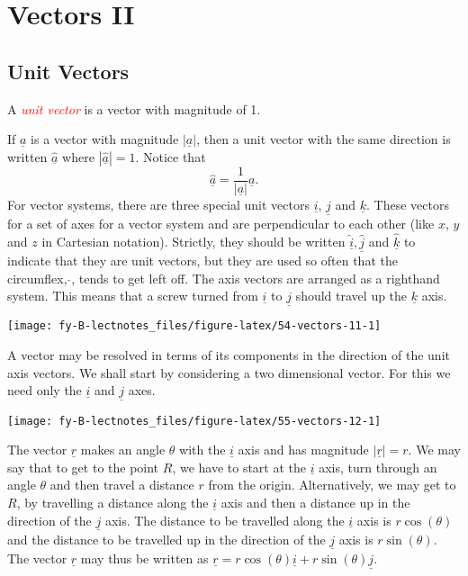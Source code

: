 \documentclass[
  11pt,
  oneside]{book}
\newcommand{\slide}{}
\theoremstyle{definition}
\theoremstyle{definition}
\theoremstyle{definition}
\theoremstyle{definition}
\theoremstyle{remark}
\begin{document}
\slide

\section{Vectors II}\label{vectors-ii}

\subsection{Unit Vectors}\label{unit-vectors}

A \textcolor{red}{\em unit vector} is a vector with magnitude of 1.

If \(\underline a\) is a vector with magnitude \(|\underline a|\), then a unit vector with the same direction is written \(\hat{\underline a}\) where \(|\hat{\underline a}| = 1\). Notice that
\[
\hat{\underline a} = \frac1{|\underline a|}{\underline a}.
\]
For vector systems, there are three special unit vectors \(\underline i\), \(\underline j\) and \(\underline k\). These vectors for a set of axes for a vector system and are perpendicular to each other (like \(x\), \(y\) and \(z\) in Cartesian notation). Strictly, they should be written \(\hat{\underline i}, \hat{\underline j}\) and \(\hat{\underline k}\) to indicate that they are unit vectors, but they are used so often that the circumflex, \(\hat{}\), tends to get left off. The axis vectors are arranged as a righthand system. This means that a screw turned from \(\underline i\) to \(\underline j\) should travel up the \(\underline k\) axis.

\begin{center}\texttt{[image: fy-B-lectnotes\_files/figure-latex/54-vectors-11-1]} \end{center}

A vector may be resolved in terms of its components in the direction of the unit axis vectors. We shall start by considering a two dimensional vector. For this we need only the \(\underline i\) and \(\underline j\) axes.

\begin{center}\texttt{[image: fy-B-lectnotes\_files/figure-latex/55-vectors-12-1]} \end{center}

The vector \(\underline r\) makes an angle \(\theta\) with the \(\underline i\) axis and has magnitude \(|\underline r| = r\). We may say that to get to the point \(R\), we have to start at the \(\underline i\) axis, turn through an angle \(\theta\) and then travel a distance \(r\) from the origin. Alternatively, we may get to \(R\), by travelling a distance along the \(\underline i\) axis and then a distance up in the direction of the \(\underline j\) axis. The distance to be travelled along the \(\underline i\) axis is \(r\cos(\theta)\) and the distance to be travelled up in the direction of the \(\underline j\) axis is \(r\sin(\theta)\). The vector \(\underline r\) may thus be written as \(\underline r = r\cos(\theta) \underline i + r\sin(\theta)\underline j\).
\end{document}
